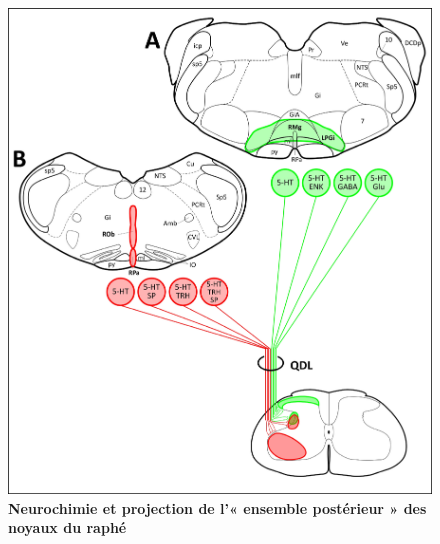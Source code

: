 \documentclass[a4paper,12pt,twoside]{report}
\begin{document}
\begin{figure}[p]

\begin{center}
 \includegraphics[scale=0.7]{Figure5.jpg} 
\end{center}

\caption{\textbf{Neurochimie et projection de l’« ensemble postérieur » des noyaux du raphé}}


\end{figure}
\end{document}
